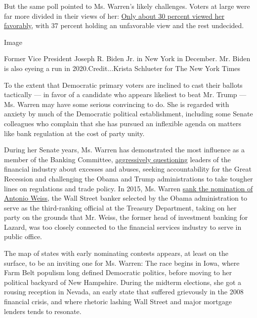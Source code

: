 But the same poll pointed to Ms. Warren's likely challenges. Voters at
large were far more divided in their views of her:
\href{https://poll.qu.edu/national/release-detail?ReleaseID=2591}{Only
about 30 percent viewed her favorably}, with 37 percent holding an
unfavorable view and the rest undecided.

Image

Former Vice President Joseph R. Biden Jr. in New York in December. Mr.
Biden is also eyeing a run in 2020.Credit...Krista Schlueter for The New
York Times

To the extent that Democratic primary voters are inclined to cast their
ballots tactically --- in favor of a candidate who appears likeliest to
beat Mr. Trump --- Ms. Warren may have some serious convincing to do.
She is regarded with anxiety by much of the Democratic political
establishment, including some Senate colleagues who complain that she
has pursued an inflexible agenda on matters like bank regulation at the
cost of party unity.

During her Senate years, Ms. Warren has demonstrated the most influence
as a member of the Banking Committee,
\href{https://www.nytimes3xbfgragh.onion/2016/09/21/business/dealbook/wells-fargo-ceo-john-stumpf-senate-testimony.html}{aggressively
questioning} leaders of the financial industry about excesses and
abuses, seeking accountability for the Great Recession and challenging
the Obama and Trump administrations to take tougher lines on regulations
and trade policy. In 2015, Ms. Warren
\href{https://www.nytimes3xbfgragh.onion/2014/11/28/business/economy/liberal-treasury-nominees-deal-making-prowess-could-be-a-liability-.html?module=inline}{sank
the nomination of Antonio Weiss}, the Wall Street banker selected by the
Obama administration to serve as the third-ranking official at the
Treasury Department, taking on her party on the grounds that Mr. Weiss,
the former head of investment banking for Lazard, was too closely
connected to the financial services industry to serve in public office.

The map of states with early nominating contests appears, at least on
the surface, to be an inviting one for Ms. Warren: The race begins in
Iowa, where Farm Belt populism long defined Democratic politics, before
moving to her political backyard of New Hampshire. During the midterm
elections, she got a rousing reception in Nevada, an early state that
suffered grievously in the 2008 financial crisis, and where rhetoric
lashing Wall Street and major mortgage lenders tends to resonate.

